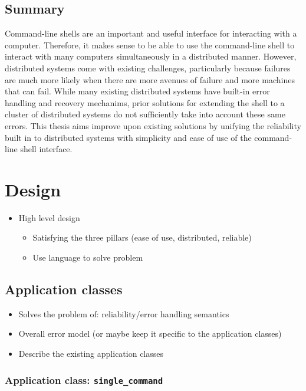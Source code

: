 \documentclass[twoside]{report}
\begin{document}
\section{Summary}
Command-line shells are an important and useful interface for interacting with a computer.
Therefore, it makes sense to be able to use the command-line shell to interact with many computers simultaneously in a distributed manner.
However, distributed systems come with existing challenges, particularly because failures are much more likely when there are more avenues of failure and more machines that can fail.
While many existing distributed systems have built-in error handling and recovery mechanims, prior solutions for extending the shell to a cluster of distributed systems do not sufficiently take into account these same errors.
This thesis aims improve upon existing solutions by unifying the reliability built in to distributed systems with simplicity and ease of use of the command-line shell interface.

\chapter{Design}

\begin{itemize}
  \item High level design
  \begin{itemize}
    \item Satisfying the three pillars (ease of use, distributed, reliable)
    \item Use language to solve problem
  \end{itemize}
\end{itemize}

\section{Application classes}

\begin{itemize}
  \item Solves the problem of: reliability/error handling semantics
  \item Overall error model (or maybe keep it specific to the application classes)
  \item Describe the existing application classes
\end{itemize}

\subsection{Application class: \texttt{single\_command}}
\end{document}
